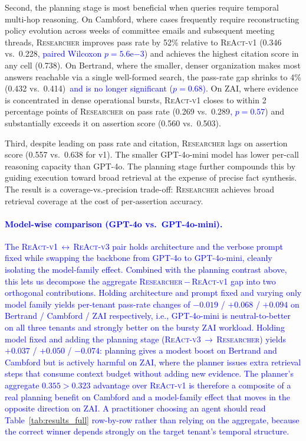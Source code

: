 Second, the planning stage is most beneficial when queries require temporal multi-hop reasoning. On Cambford, where cases frequently require reconstructing policy evolution across weeks of committee emails and subsequent meeting threads, \textsc{Researcher} improves pass rate by 52\% relative to \textsc{ReAct-v1} (0.346 vs.\ 0.228\textcolor{blue}{, paired Wilcoxon $p{=}5.6\mathrm{e}{-3}$}) and achieves the highest citation score in any cell (0.738). On Bertrand, where the smaller, denser organization makes most answers reachable via a single well-formed search, the pass-rate gap shrinks to 4\% (0.432 vs.\ 0.414)\textcolor{blue}{\ and is no longer significant ($p{=}0.68$)}. On ZAI, where evidence is concentrated in dense operational bursts, \textsc{ReAct-v1} closes to within 2 percentage points of \textsc{Researcher} on pass rate (0.269 vs.\ 0.289\textcolor{blue}{, $p{=}0.57$}) and substantially exceeds it on assertion score (0.560 vs.\ 0.503).

Third, despite leading on pass rate and citation, \textsc{Researcher} lags on assertion score (0.557 vs.\ 0.638 for v1). The smaller GPT-4o-mini model has lower per-call reasoning capacity than GPT-4o. The planning stage further compounds this by guiding execution toward broad retrieval at the expense of precise fact synthesis. The result is a coverage-vs.-precision trade-off: \textsc{Researcher} achieves broad retrieval coverage at the cost of per-assertion accuracy.

\paragraph{\textcolor{blue}{Model-wise comparison (GPT-4o vs.\ GPT-4o-mini).}}
\label{sec:ablation-model}
\textcolor{blue}{The \textsc{ReAct-v1}\,$\leftrightarrow$\,\textsc{ReAct-v3} pair holds architecture and the verbose prompt fixed while swapping the backbone from GPT-4o to GPT-4o-mini, cleanly isolating the model-family effect. Combined with the planning contrast above, this lets us decompose the aggregate \textsc{Researcher}\,$-$\,\textsc{ReAct-v1} gap into two orthogonal contributions. Holding architecture and prompt fixed and varying only model family yields per-tenant pass-rate changes of $-0.019$ / $+0.068$ / $+0.094$ on Bertrand / Cambford / ZAI respectively, i.e., GPT-4o-mini is neutral-to-better on all three tenants and strongly better on the bursty ZAI workload. Holding model fixed and adding the planning stage (\textsc{ReAct-v3}\,$\to$\,\textsc{Researcher}) yields $+0.037$ / $+0.050$ / $-0.074$: planning gives a modest boost on Bertrand and Cambford but is actively harmful on ZAI, where the planner issues extra retrieval steps that consume context budget without adding new evidence. The planner's aggregate $0.355 > 0.323$ advantage over \textsc{ReAct-v1} is therefore a composite of a real planning benefit on Cambford and a model-family effect that moves in the opposite direction on ZAI. A practitioner choosing an agent should read Table~\ref{tab:results_full} row-by-row rather than relying on the aggregate, because the correct winner depends strongly on the target tenant's temporal structure.}

